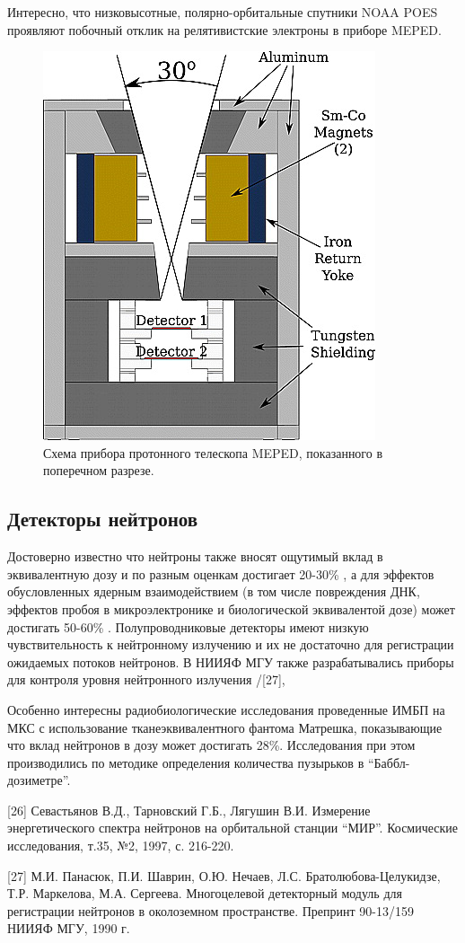 Интересно, что низковысотные, полярно-орбитальные спутники NOAA POES проявляют побочный отклик на релятивистские электроны в приборе MEPED\cite{Yando2011}.
\begin{figure}
	\centering
	\includegraphics[width=0.3\linewidth]{images/jgra21383-fig-0002}
	\caption{Схема прибора протонного телескопа MEPED, показанного в поперечном разрезе.\cite{Yando2011}}
	\label{fig:jgra21383-fig-0002}
\end{figure}


\subsection{Детекторы нейтронов} \label{subsect1_3_1}
Достоверно известно что нейтроны также вносят ощутимый вклад в эквивалентную дозу и по разным оценкам достигает 20-30\% \cite{Dudkin1990}, а для эффектов обусловленных ядерным взаимодействием (в том числе повреждения ДНК, эффектов пробоя в микроэлектронике и биологической эквивалентой дозе) может достигать 50-60\% \cite{Armstrong2001}. Полупроводниковые детекторы имеют низкую чувствительность к нейтронному излучению и их не достаточно для регистрации ожидаемых потоков нейтронов. В НИИЯФ МГУ также разрабатывались приборы для контроля уровня нейтронного излучения  /[27],\cite{Shavrin2002}

Особенно интересны радиобиологические исследования проведенные ИМБП \cite{Shurshakov2016} на МКС с использование тканеэквивалентного фантома Матрешка, показывающие что вклад нейтронов в дозу может достигать 28\%.  Исследования при этом производились по методике определения количества пузырьков в ``Баббл-дозиметре''.

[26]  Севастьянов В.Д., Тарновский Г.Б., Лягушин В.И.  Измерение энергетического спектра нейтронов на орбитальной станции “МИР”.  Космические исследования, т.35, №2, 1997, с. 216-220.

[27]  М.И. Панасюк, П.И. Шаврин, О.Ю. Нечаев, Л.С. Братолюбова-Целукидзе, Т.Р. Маркелова, М.А. Сергеева. Многоцелевой детекторный модуль для регистрации нейтронов в околоземном пространстве. Препринт 90-13/159 НИИЯФ МГУ, 1990 г.

